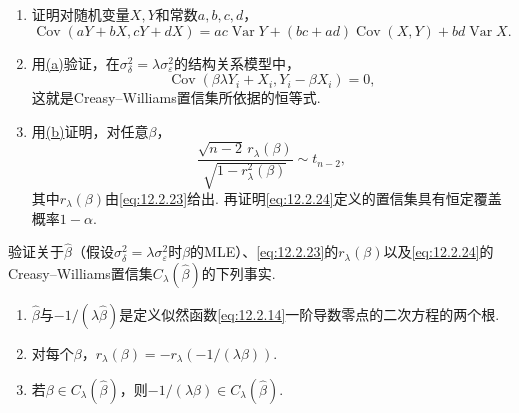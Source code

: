 \begin{exercise}\label{exercise:12.11}\leavevmode
\begin{enumerate}[label=(\alph*)]
\item\label{item:12.11.a} 证明对随机变量$X,Y$和常数$a,b,c,d$，
$$\operatorname{Cov}(aY+bX,cY+dX)=ac\operatorname{Var}Y+(bc+ad)\operatorname{Cov}(X,Y)+bd\operatorname{Var}X.$$
\item\label{item:12.11.b} 用\hyperref[item:12.11.a]{(a)}验证，在$\sigma_\delta^2=\lambda\sigma_\varepsilon^2$的结构关系模型中，
$$\operatorname{Cov}(\beta\lambda Y_i+X_i,Y_i-\beta X_i)=0,$$
这就是Creasy--Williams置信集所依据的恒等式.
\item\label{item:12.11.c} 用\hyperref[item:12.11.b]{(b)}证明，对任意$\beta$，
$$\frac{\sqrt{n-2}\,r_\lambda(\beta)}{\sqrt{1-r_\lambda^2(\beta)}}\sim t_{n-2},$$
其中$r_\lambda(\beta)$由\eqref{eq:12.2.23}给出. 再证明\eqref{eq:12.2.24}定义的置信集具有恒定覆盖概率$1-\alpha$.
\end{enumerate}
\end{exercise}

\begin{exercise}\label{exercise:12.12}
验证关于$\hat\beta$（假设$\sigma_\delta^2=\lambda\sigma_\varepsilon^2$时$\beta$的MLE）、\eqref{eq:12.2.23}的$r_\lambda(\beta)$以及\eqref{eq:12.2.24}的Creasy--Williams置信集$C_\lambda(\hat\beta)$的下列事实.
\begin{enumerate}[label=(\alph*)]
\item\label{item:12.12.a} $\hat\beta$与$-1/(\lambda\hat\beta)$是定义似然函数\eqref{eq:12.2.14}一阶导数零点的二次方程的两个根.
\item\label{item:12.12.b} 对每个$\beta$，$r_\lambda(\beta)=-r_\lambda(-1/(\lambda\beta))$.
\item\label{item:12.12.c} 若$\beta\in C_\lambda(\hat\beta)$，则$-1/(\lambda\beta)\in C_\lambda(\hat\beta)$.
\end{enumerate}
\end{exercise}

